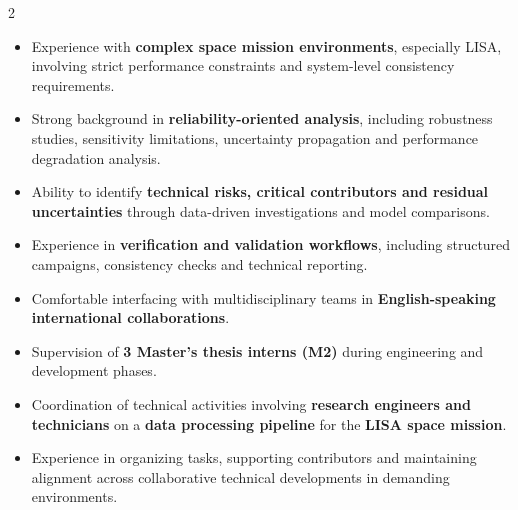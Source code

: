 \documentclass[8pt,a4paper,ragged2e,withhyper]{altacv}
\begin{document}
\begin{paracol}{2}
\begin{itemize}
  \item Experience with \textbf{complex space mission environments}, especially LISA, involving strict performance constraints and system-level consistency requirements.
  \item Strong background in \textbf{reliability-oriented analysis}, including robustness studies, sensitivity limitations, uncertainty propagation and performance degradation analysis.
  \item Ability to identify \textbf{technical risks, critical contributors and residual uncertainties} through data-driven investigations and model comparisons.
  \item Experience in \textbf{verification and validation workflows}, including structured campaigns, consistency checks and technical reporting.
  \item Comfortable interfacing with multidisciplinary teams in \textbf{English-speaking international collaborations}.
\end{itemize}


\begin{itemize}
  \item Supervision of \textbf{3 Master's thesis interns (M2)} during engineering and development phases.
  \item Coordination of technical activities involving \textbf{research engineers and technicians} on a \textbf{data processing pipeline} for the \textbf{LISA space mission}.
  \item Experience in organizing tasks, supporting contributors and maintaining alignment across collaborative technical developments in demanding environments.
\end{itemize}


\divider

\divider

\medskip


\divider

\divider

\divider




\end{paracol}
\end{document}
